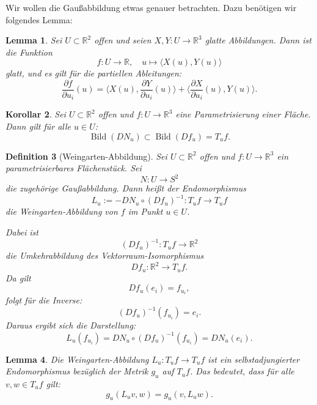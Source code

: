 \documentclass[a4paper,12pt]{article}
\theoremstyle{break}
\newtheorem{definition}{Definition}[section]
\newtheorem{lemma}[definition]{Lemma}
\newtheorem{corollary}[definition]{Korollar}
\begin{document}
Wir wollen die Gaußabbildung etwas genauer betrachten. Dazu benötigen wir folgendes Lemma:

\begin{lemma}
Sei $U \subset \mathbb{R}^2$ offen und seien $X, Y: U \to \mathbb{R}^3$ glatte Abbildungen. Dann ist die Funktion
\[
f: U \to \mathbb{R}, \quad u \mapsto \langle X(u), Y(u) \rangle
\]
glatt, und es gilt für die partiellen Ableitungen:
\[
\frac{\partial f}{\partial u_i} (u) = \langle X(u), \frac{\partial Y}{\partial u_i} (u) \rangle + \langle \frac{\partial X}{\partial u_i} (u), Y(u) \rangle.
\]
\end{lemma}

\begin{corollary}
Sei $U \subset \mathbb{R}^2$ offen und $f: U \to \mathbb{R}^3$ eine Parametrisierung einer Fläche. Dann gilt für alle $u \in U$:
\[
\operatorname{Bild}(D N_u) \subset \operatorname{Bild}(D f_u) = T_u f.
\]
\end{corollary}

\begin{definition}[Weingarten-Abbildung]
Sei $U \subset \mathbb{R}^2$ offen und $f: U \to \mathbb{R}^3$ ein parametrisierbares Flächenstück. Sei  
\[
N: U \to S^2
\]
die zugehörige Gaußabbildung. Dann heißt der Endomorphismus  
\[
L_u := - D N_u \circ (D f_u)^{-1}: T_u f \to T_u f
\]
die \emph{Weingarten-Abbildung} von $f$ im Punkt $u \in U$.

Dabei ist  
\[
(D f_u)^{-1}: T_u f \to \mathbb{R}^2
\]
die Umkehrabbildung des Vektorraum-Isomorphismus  
\[
D f_u: \mathbb{R}^2 \to T_u f.
\]
Da gilt  
\[
D f_u(e_i) = f_{u_i},
\]
folgt für die Inverse:  
\[
(D f_u)^{-1}(f_{u_i}) = e_i.
\]
Daraus ergibt sich die Darstellung:
\[
L_u (f_{u_i}) = D N_u \circ (D f_u)^{-1} (f_{u_i}) = D N_u (e_i).
\]
\end{definition}

\begin{lemma}
Die Weingarten-Abbildung $L_u: T_u f \to T_u f$ ist ein selbstadjungierter Endomorphismus bezüglich der Metrik $g_u$ auf $T_u f$. Das bedeutet, dass für alle $v, w \in T_u f$ gilt:
\[
g_u(L_u v, w) = g_u(v, L_u w).
\]
\end{lemma}
\end{document}
